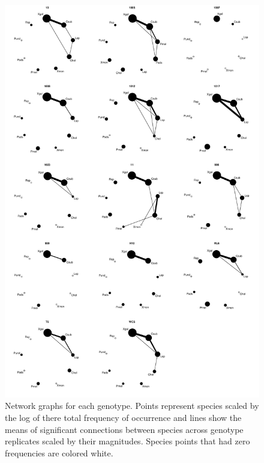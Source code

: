 \documentclass[11pt]{amsart}
\begin{document}
\begin{figure} 
\begin{center} 
\includegraphics{ONC_Lichen_Summary-gplots}
\end{center} 
\caption{Network graphs for each genotype. Points represent species scaled by
the log of there total frequency of occurrence and lines show the
means of significant connections between species across genotype
replicates scaled by their magnitudes. Species points that had zero
frequencies are colored white.}

\label{fig:one}
\end{figure}


\end{document}
